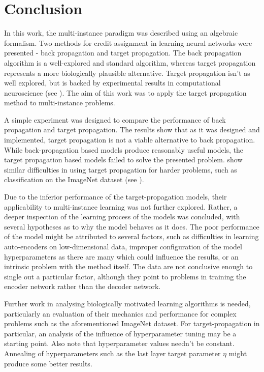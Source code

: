 \chapter*{Conclusion}

In this work, the multi-instance paradigm was described using an algebraic formalism. Two methods for credit assignment in learning neural networks were presented - back propagation and target propagation. The back propagation algorithm is a well-explored and standard algorithm, whereas target propagation represents a more biologically plausible alternative. Target propagation isn't as well explored, but is backed by experimental results in computational neuroscience (see \cite{guerguiev_towards_2017}). The aim of this work was to apply the target propagation method to multi-instance problems.

A simple experiment was designed to compare the performance of back propagation and target propagation. The results show that as it was designed and implemented, target propagation is not a viable alternative to back propagation. While back-propagation based models produce reasonably useful models, the target propagation based models failed to solve the presented problem. \cite{bartunov_assessing_2018} show similar difficulties in using target propagation for harder problems, such as classification on the ImageNet dataset (see \cite{russakovsky_imagenet_2015}).

Due to the inferior performance of the target-propagation models, their applicability to multi-instance learning was not further explored. Rather, a deeper inspection of the learning process of the models was concluded, with several hypotheses as to why the model behaves as it does. The poor performance of the model might be attributed to several factors, such as difficulties in learning auto-encoders on low-dimensional data, improper configuration of the model hyperparameters as there are many which could influence the results, or an intrinsic problem with the method itself. The data are not conclusive enough to single out a particular factor, although they point to problems in training the encoder network rather than the decoder network.

Further work in analysing biologically motivated learning algorithms is needed, particularly an evaluation of their mechanics and performance for complex problems such as the aforementioned ImageNet dataset. For target-propagation in particular, an analysis of the influence of hyperparameter tuning may be a starting point. Also note that hyperparameter values needn't be constant. Annealing of hyperparameters such as the last layer target parameter \( \eta \) might produce some better results.
